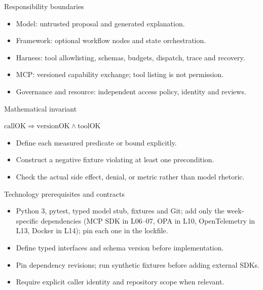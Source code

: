 \documentclass[aspectratio=169,10pt]{beamer}
\begin{document}
\begin{frame}{Responsibility boundaries}
\small
\begin{itemize}
\item Model: untrusted proposal and generated explanation.
\item Framework: optional workflow nodes and state orchestration.
\item Harness: tool allowlisting, schemas, budgets, dispatch, trace and recovery.
\item MCP: versioned capability exchange; tool listing is not permission.
\item Governance and resource: independent access policy, identity and reviews.
\end{itemize}

\end{frame}

\begin{frame}{Mathematical invariant}
\small
\begin{center}\Large $\mathrm{callOK}\Rightarrow\mathrm{versionOK}\land\mathrm{toolOK}$\end{center}
\begin{itemize}
\item Define each measured predicate or bound explicitly.
\item Construct a negative fixture violating at least one precondition.
\item Check the actual side effect, denial, or metric rather than model rhetoric.
\end{itemize}

\end{frame}

\begin{frame}{Technology prerequisites and contracts}
\small
\begin{itemize}
\item Python 3, pytest, typed model stub, fixtures and Git; add only the week-specific dependencies (MCP SDK in L06--07, OPA in L10, OpenTelemetry in L13, Docker in L14); pin each one in the lockfile.
\item Define typed interfaces and schema version before implementation.
\item Pin dependency revisions; run synthetic fixtures before adding external SDKs.
\item Require explicit caller identity and repository scope when relevant.
\end{itemize}

\end{frame}
\end{document}
